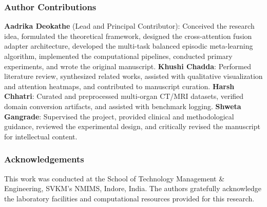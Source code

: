 \documentclass[runningheads]{llncs}
\begin{document}
\subsubsection*{Author Contributions}
\textbf{Aadrika Deokathe} (Lead and Principal Contributor): Conceived the research idea, formulated the theoretical framework, designed the cross-attention fusion adapter architecture, developed the multi-task balanced episodic meta-learning algorithm, implemented the computational pipelines, conducted primary experiments, and wrote the original manuscript.
\textbf{Khushi Chadda}: Performed literature review, synthesized related works, assisted with qualitative visualization and attention heatmaps, and contributed to manuscript curation.
\textbf{Harsh Chhatri}: Curated and preprocessed multi-organ CT/MRI datasets, verified domain conversion artifacts, and assisted with benchmark logging.
\textbf{Shweta Gangrade}: Supervised the project, provided clinical and methodological guidance, reviewed the experimental design, and critically revised the manuscript for intellectual content.

\subsubsection*{Acknowledgements}
This work was conducted at the School of Technology Management \& Engineering, SVKM's NMIMS, Indore, India. The authors gratefully acknowledge the laboratory facilities and computational resources provided for this research.
\end{document}
